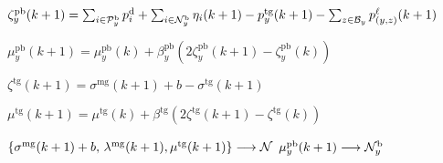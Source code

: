 \begin{algorithm*}[htbp]
\begin{algorithmic}[1]
\State
$\zeta^{\text{pb}}_y(k+1)   = \sum_{i \in \mathcal P_y^{\mathrm{b}}} p_i^{\mathrm{d}} + \sum_{i \in \mathcal N_y^{\mathrm{b}}} \eta_i(k+1)- p^{\text{tg}}_y(k+1) - \sum_{z \in \mathcal B_y} p^\ell_{(y,z)} (k+1)$

\State
$\mu_y^{\text{pb}}(k+1) = \mu_y^{\text{pb}}(k) + \beta^{\text{pb}}_y (2 \zeta^{\text{pb}}_y(k+1)- \zeta^{\text{pb}}_y(k))$
\EndFor

\State
$\zeta^{\text{tg}}(k+1) = \sigma^{\text{mg}}
	(k+1)+b- \sigma^{\text{tg}}(k+1)$

\State
$\mu^{\text{tg}}(k+1) = \mu^{\text{tg}}(k) + \beta^{\text{tg}} (2\zeta^{\text{tg}}(k+1)-\zeta^{\text{tg}}(k))$
\EndDual	

\State
$ \{ \sigma^{\mathrm{mg}}(k+1)+b, \, \lambda^{\text{mg}}(k+1), \mu^{\text{tg}}(k+1) \} 
	\longrightarrow  \mathcal N$
\State
$\mu^{\text{pb}}_y(k+1)\longrightarrow \mathcal N_y^{\mathrm{b}}$
\EndFor

\EndComm

\EndDNO	

\EndIUC	

\end{algorithmic}
\end{algorithm*}


